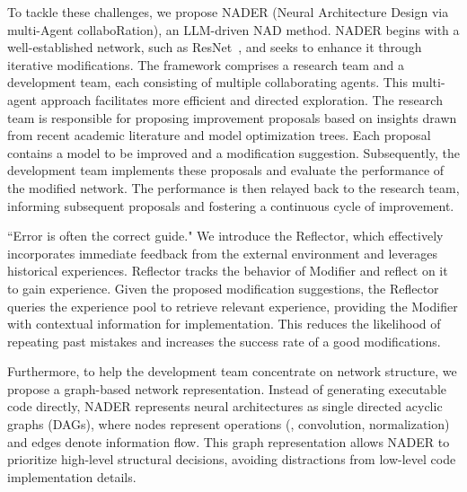 To tackle these challenges, we propose NADER (Neural Architecture Design via multi-Agent collaboRation), an LLM-driven NAD method. NADER begins with a well-established network, such as ResNet~\cite{he2016deep}, and seeks to enhance it through iterative modifications. 
The framework comprises a research team and a development team, each consisting of multiple collaborating agents. This multi-agent approach facilitates more efficient and directed exploration. 
The research team is responsible for proposing improvement proposals based on insights drawn from recent academic literature and model optimization trees.
Each proposal contains a model to be improved and a modification suggestion.
Subsequently, the development team implements these proposals and evaluate the performance of the modified network.
The performance is then relayed back to the research team, informing subsequent proposals and fostering a continuous cycle of improvement.

``Error is often the correct guide." We introduce the Reflector, which effectively incorporates immediate feedback from the external environment and leverages historical experiences.
Reflector tracks the behavior of Modifier and reflect on it to gain experience.
Given the proposed modification suggestions, the Reflector queries the experience pool to retrieve relevant experience, providing the Modifier with contextual information for implementation.
This reduces the likelihood of repeating past mistakes and increases the success rate of a good modifications.

Furthermore, to help the development team concentrate on network structure, we propose a graph-based network representation. Instead of generating executable code directly, NADER represents neural architectures as single directed acyclic graphs (DAGs), where nodes represent operations (\eg, convolution, normalization) and edges denote information flow. This graph representation allows NADER to prioritize high-level structural decisions, avoiding distractions from low-level code implementation details.

